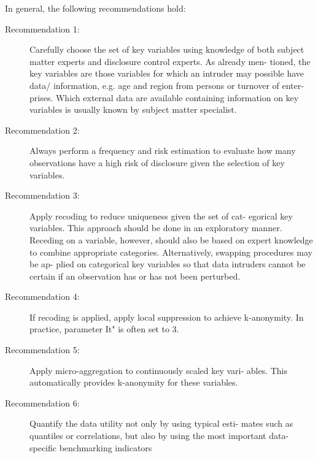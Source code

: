 \documentclass[]{article}
\begin{document}
\newpage
In general, the following recommendations hold:
\begin{description}
\item[Recommendation 1:] Carefully choose the set of key variables using knowledge
of both subject matter experts and disclosure control experts. As already men-
tioned, the key variables are those variables for which an intruder may possible
have data/ information, e.g. age and region from persons or turnover of enter-
prises. Which external data are available containing information on key variables
is usually known by subject matter specialist.
\item[Recommendation 2:] Always perform a frequency and risk estimation to evaluate
how many observations have a high risk of disclosure given the selection of key
variables.
\item[Recommendation 3:] Apply recoding to reduce uniqueness given the set of cat-
egorical key variables. This approach should be done in an exploratory manner.
Receding on a variable, however, should also be based on expert knowledge to
combine appropriate categories. Alternatively, swapping procedures may be ap-
plied on categorical key variables so that data intruders cannot be certain if an
observation has or has not been perturbed.
\item[Recommendation 4:] If recoding is applied, apply local suppression to achieve
k-anonymity. In practice, parameter It" is often set to 3.
\item[Recommendation 5:] Apply micro-aggregation to continuously scaled key vari-
ables. This automatically provides k-anonymity for these variables.
\item[Recommendation 6:] Quantify the data utility not only by using typical esti-
mates such as quantiles or correlations, but also by using the most important
data-speciﬁc benchmarking indicators
\end{description}
\end{document}
